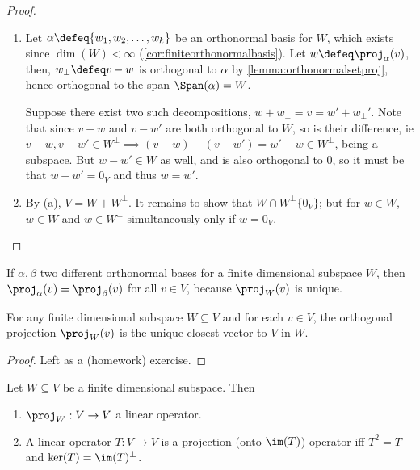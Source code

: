 \begin{proof}
    \begin{enumerate}[label=(\alph*)]
        \item {} Let $\alpha \defeq \{w_1, w_2, \dots, w_k\}$ be an orthonormal basis for $W$, which exists since $\dim(W) < \infty$ (\cref{cor:finiteorthonormalbasis}). Let $w \defeq \proj_\alpha(v)$, then, $w_\perp \defeq v - w$ is orthogonal to $\alpha$ by \cref{lemma:orthonormalsetproj}, hence orthogonal to the span $\Span(\alpha) = W$.
        
         Suppose there exist two such decompositions, $w + w_\perp = v = w' + w_\perp'$. Note that since $v - w$ and $v - w'$ are both orthogonal to $W$, so is their difference, ie $v -w,  v - w' \in W^\perp \implies (v- w) - (v - w')  = w' - w\in W^\perp$, being a subspace. But $w - w' \in W$ as well, and is also orthogonal to $0$, so it must be that $w - w' = 0_V$ and thus $w = w'$.
        
        \item By (a), $V = W + W^\perp$. It remains to show that $W \cap W^\perp \{0_V\}$; but for $w \in W$, $w \in W$ and $w \in W^\perp$ simultaneously only if $w = 0_V$.
    \end{enumerate}
\end{proof}

\begin{remark}
    If $\alpha, \beta$ two different orthonormal bases for a finite dimensional subspace $W$, then $\proj_\alpha(v) = \proj_\beta(v)$ for all $v \in V$, because $\proj_W(v)$ is unique.
\end{remark}

\begin{theorem}
    For any finite dimensional subspace $W \subseteq V$ and for each $v \in V$, the orthogonal projection $\proj_W(v)$ is the unique closest vector to $V$ in $W$.
\end{theorem}

\begin{proof}
    Left as a (homework) exercise.
\end{proof}

\begin{proposition}
    Let $W \subseteq V$ be a finite dimensional subspace. Then \begin{enumerate}[label=(\alph*)]
        \item $\proj_W: V \to V$ a linear operator.
        \item A linear operator $T : V \to V$ is a projection (onto $\im(T)$) operator iff $T^2 = T$ and $\ker(T) = \im(T)^\perp$.
    \end{enumerate}
\end{proposition}

